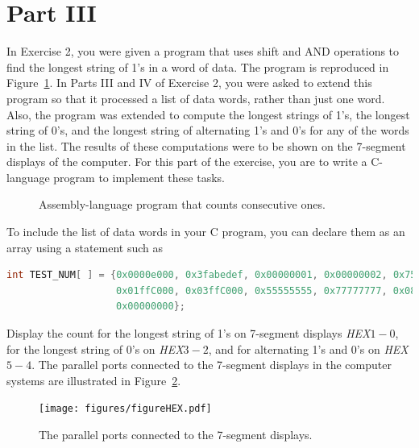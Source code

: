 \documentclass[epsfig,10pt,fullpage]{article}
\begin{document}
\section*{Part III}
In Exercise 2, you were given a program that uses shift and AND operations to find the
longest string of 1's in a word of data. The program is reproduced in
Figure~\ref{fig:shiftAND}.  In Parts III and IV of Exercise 2, you were asked to extend
this program so that it processed a list of data words, rather than just one word. Also,
the program was extended to compute the longest
strings of 1's, the longest string of 0's, and the longest string of alternating 1's and 0's
for any of the words in the list. The results of these computations were to be shown 
on the 7-segment displays of the computer. For this part of the exercise, you are 
to write a C-language program to implement these tasks.

\begin{figure}[H]
\begin{center}

\end{center}
\caption{Assembly-language program that counts consecutive ones.}
\label{fig:shiftAND}
\end{figure}

To include the list of data words in your C program, you can declare them as an array using
a statement such as

\begin{lstlisting}[language=C]
int TEST_NUM[ ] = {0x0000e000, 0x3fabedef, 0x00000001, 0x00000002, 0x75a5a5a5,
                   0x01ffC000, 0x03ffC000, 0x55555555, 0x77777777, 0x08888888,
                   0x00000000};
\end{lstlisting}


Display the count for the longest string of 1's on 7-segment displays {\it HEX}$1-0$, 
for the longest string of 0's on {\it HEX}$3-2$, and for 
alternating 1's and 0's on {\it HEX}$5-4$. 
The parallel ports connected to the 7-segment displays in the computer systems
are illustrated in Figure~\ref{fig:HEX}.

\begin{figure}[H]
	\begin{center}
	\texttt{[image: figures/figureHEX.pdf]}
	\end{center}
	\caption{The parallel ports connected to the 7-segment displays.}
\label{fig:HEX}
\end{figure}
\end{document}
